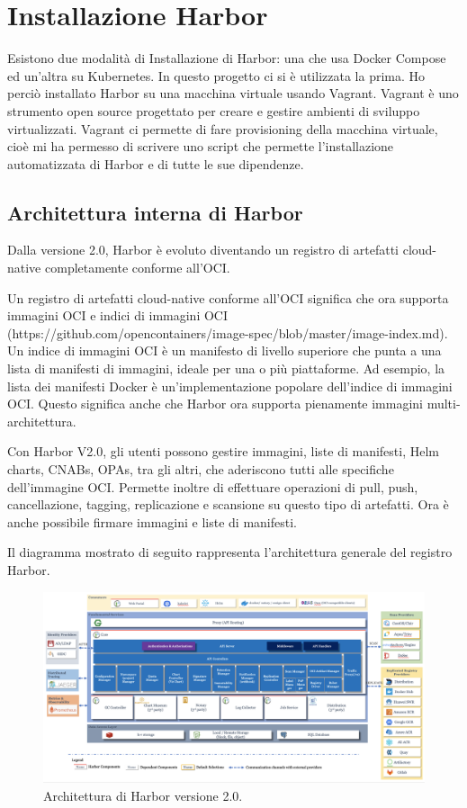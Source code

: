 \documentclass[12pt]{report}
\begin{document}
\chapter{Installazione Harbor}
Esistono due modalità di Installazione di Harbor: una che usa Docker Compose ed un'altra su Kubernetes. In questo progetto ci si è utilizzata la prima. Ho perciò installato Harbor su una macchina virtuale usando Vagrant. Vagrant è uno strumento open source progettato per creare e gestire ambienti di sviluppo virtualizzati. Vagrant ci permette di fare provisioning della macchina virtuale, cioè mi ha permesso di scrivere uno script che permette l'installazione automatizzata di Harbor e di tutte le sue dipendenze.
\section{Architettura interna di Harbor}
Dalla versione 2.0, Harbor è evoluto diventando un registro di artefatti cloud-native completamente conforme all'OCI.

Un registro di artefatti cloud-native conforme all'OCI significa che ora supporta immagini OCI e indici di immagini OCI (https://github.com/opencontainers/image-spec/blob/master/image-index.md). Un indice di immagini OCI è un manifesto di livello superiore che punta a una lista di manifesti di immagini, ideale per una o più piattaforme. Ad esempio, la lista dei manifesti Docker è un'implementazione popolare dell'indice di immagini OCI. Questo significa anche che Harbor ora supporta pienamente immagini multi-architettura.

Con Harbor V2.0, gli utenti possono gestire immagini, liste di manifesti, Helm charts, CNABs, OPAs, tra gli altri, che aderiscono tutti alle specifiche dell'immagine OCI. Permette inoltre di effettuare operazioni di pull, push, cancellazione, tagging, replicazione e scansione su questo tipo di artefatti. Ora è anche possibile firmare immagini e liste di manifesti.

Il diagramma mostrato di seguito rappresenta l'architettura generale del registro Harbor.

\begin{figure}[h]
\centering
\includegraphics[width=\textwidth]{images/architecture.png}
\caption{Architettura di Harbor versione 2.0.}
\end{figure}
\end{document}
